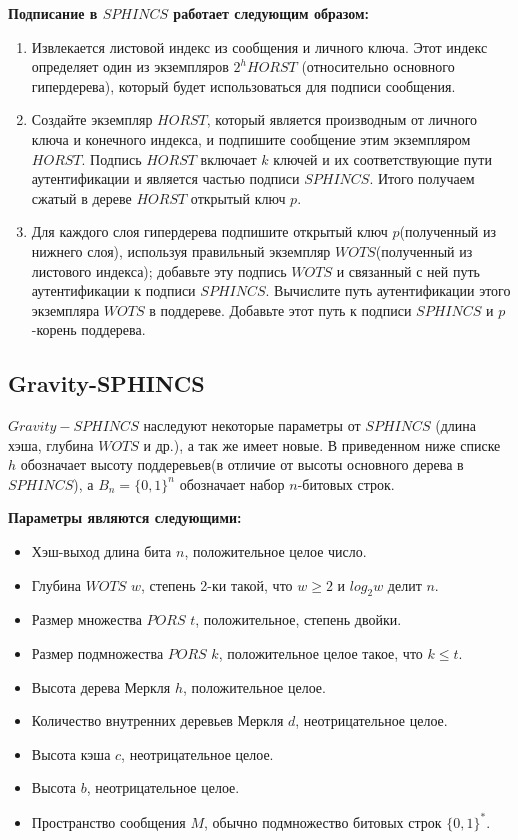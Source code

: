 \documentclass[a4paper, 14pt]{extarticle}
\begin{document}
\textbf{Подписание в $SPHINCS$ работает следующим образом:}

\begin{enumerate}
    \item Извлекается листовой индекс из сообщения и личного ключа. Этот индекс определяет один из экземпляров $2^{h} HORST$ (относительно основного гипердерева), который будет использоваться для подписи сообщения.
    \item Создайте экземпляр $HORST$, который является производным от личного ключа и конечного индекса, и подпишите сообщение этим экземпляром $HORST$. Подпись $HORST$ включает $k$ ключей и их соответствующие пути аутентификации и является частью подписи $SPHINCS$. Итого получаем сжатый в дереве $HORST$ открытый ключ $p$.
    \item Для каждого слоя гипердерева подпишите открытый ключ $p$(полученный из нижнего слоя), используя правильный экземпляр $WOTS$(полученный из листового индекса); добавьте эту подпись $WOTS$ и связанный с ней путь аутентификации к подписи $SPHINCS$. Вычислите путь аутентификации этого экземпляра $WOTS$ в поддереве. Добавьте этот путь к подписи $SPHINCS$ и $p$-корень поддерева.
\end{enumerate}

\subsection{Gravity-SPHINCS}
$Gravity-SPHINCS$ наследуют некоторые параметры от $SPHINCS$ (длина хэша, глубина $WOTS$ и др.), а так же имеет новые. В приведенном ниже списке $h$ обозначает высоту поддеревьев(в отличие от высоты основного дерева в $SPHINCS$), а $B_{n} = \{0,1\}^{n}$ обозначает набор $n$-битовых строк.
\newline

\textbf{Параметры являются следующими:}

\begin{itemize}
    \item Хэш-выход длина бита $n$, положительное целое число.
    \item Глубина $WOTS$ $w$, степень 2-ки такой, что $w \geq 2$ и $log_{2}w$ делит $n$.
    \item Размер множества $PORS$ $t$, положительное, степень двойки.
    \item Размер подмножества $PORS$ $k$, положительное целое такое, что $k \leq t$.
    \item Высота дерева Меркля $h$, положительное целое.
    \item Количество внутренних деревьев Меркля $d$, неотрицательное целое.
    \item Высота кэша $c$, неотрицательное целое.
    \item Высота $b$, неотрицательное целое.
    \item Пространство сообщения $M$, обычно подмножество битовых строк $\{0,1\}^{*}$.
\end{itemize}
\end{document}
